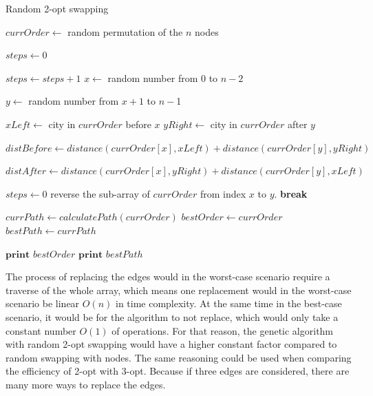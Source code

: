 \documentclass{article}
\begin{document}
\begin{algorithm}[H]
\caption{Random 2-opt swapping}
\begin{algorithmic}

    \State $currOrder \gets $ random permutation of the $n$ nodes

    \State $steps \gets 0$ 

        \State $steps \gets steps + 1$
        \State $x \gets $ random number from $0$ to $n-2$ 

        \State $y \gets $ random number from $x+1$ to $n-$1 \Comment{\textcolor{blue}{to make sure the two unique edges are picked}}


        \State $xLeft \gets $ city in $currOrder$ before $x$
        \State $yRight \gets $ city in $currOrder$ after $y$

        
        \State $distBefore \gets distance(currOrder[x], xLeft) + distance(currOrder[y], yRight)$ 

        \State $distAfter \gets distance(currOrder[x], yRight) + distance(currOrder[y], xLeft)$ 

            \State $steps \gets 0$
            \State reverse the sub-array of $currOrder$ from index $x$ to $y$.
            \State \textbf{break}
        \EndIf
    \EndWhile

    \State $currPath \gets calculatePath(currOrder)$
        \State $bestOrder \gets currOrder$
        \State $bestPath \gets currPath$
    \EndIf
\EndWhile

\State $\textbf{print } bestOrder $
\State $\textbf{print } bestPath $

\end{algorithmic}
\end{algorithm}

\noindent
The process of replacing the edges would in the worst-case scenario require a traverse of the whole array, which means one replacement would in the worst-case scenario be linear $O(n)$ in time complexity. At the same time in the best-case scenario, it would be for the algorithm to not replace, which would only take a constant number $O(1)$ of operations. For that reason, the genetic algorithm with random 2-opt swapping would have a higher constant factor compared to random swapping with nodes. The same reasoning could be used when comparing the efficiency of 2-opt with 3-opt. Because if three edges are considered, there are many more ways to replace the edges.
\end{document}
